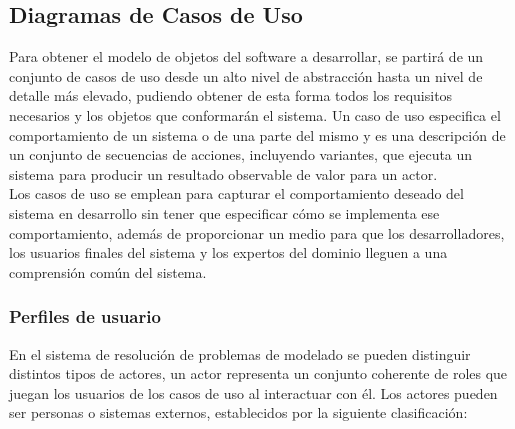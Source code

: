		\subsection{Diagramas de Casos de Uso}

		Para obtener el modelo de objetos del software a desarrollar, se partirá de un conjunto de casos de uso desde un alto nivel de abstracción hasta un nivel de detalle más elevado, pudiendo obtener de esta forma todos los requisitos necesarios y los objetos que conformarán el sistema. Un caso de uso especifica el comportamiento de un sistema o de una parte del mismo y es una descripción de un conjunto de secuencias de acciones, incluyendo variantes, que ejecuta un sistema para producir un resultado observable de valor para un actor.\\
		
		Los casos de uso se emplean para capturar el comportamiento deseado del sistema en desarrollo sin tener que especificar cómo se implementa ese comportamiento, además de proporcionar un medio para que los desarrolladores, los usuarios finales del sistema y los expertos del dominio lleguen a una comprensión común del sistema.

			\subsubsection{Perfiles de usuario}

			En el sistema de resolución de problemas de modelado se pueden distinguir distintos tipos de actores, un actor representa un conjunto coherente de roles que juegan los usuarios de los casos de uso al interactuar con él. Los actores pueden ser personas o sistemas externos, establecidos por la siguiente clasificación:
			
